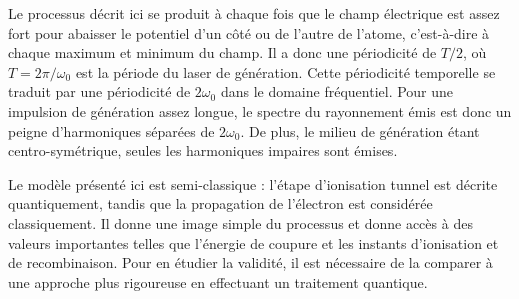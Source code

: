 Le processus décrit ici se produit à chaque fois que le champ électrique est assez fort pour abaisser le potentiel d'un côté ou de l'autre de l'atome, c'est-à-dire à chaque maximum et minimum du champ. Il a donc une périodicité de $T/2$, où $T = 2\pi/\omega_0$ est la période du laser de génération. Cette périodicité temporelle se traduit par une périodicité de $2\omega_0$ dans le domaine fréquentiel. Pour une impulsion de génération assez longue, le spectre du rayonnement émis est donc un peigne d'harmoniques séparées de $2\omega_0$. De plus, le milieu de génération étant centro-symétrique, seules les harmoniques impaires sont émises.

Le modèle présenté ici est semi-classique : l'étape d'ionisation tunnel est décrite quantiquement, tandis que la propagation de l'électron est considérée classiquement. Il donne une image simple du processus et donne accès à des valeurs importantes telles que l'énergie de coupure et les instants d'ionisation et de recombinaison. Pour en étudier la validité, il est nécessaire de la comparer à une approche plus rigoureuse en effectuant un traitement quantique.

